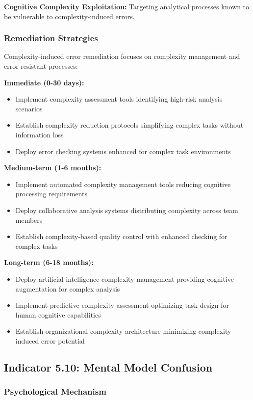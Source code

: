 \documentclass[11pt,a4paper]{article}
\begin{document}
\textbf{Cognitive Complexity Exploitation:} Targeting analytical processes known to be vulnerable to complexity-induced errors.

\subsubsection{Remediation Strategies}

Complexity-induced error remediation focuses on complexity management and error-resistant processes:

\textbf{Immediate (0-30 days):}
\begin{itemize}
\item Implement complexity assessment tools identifying high-risk analysis scenarios
\item Establish complexity reduction protocols simplifying complex tasks without information loss
\item Deploy error checking systems enhanced for complex task environments
\end{itemize}

\textbf{Medium-term (1-6 months):}
\begin{itemize}
\item Implement automated complexity management tools reducing cognitive processing requirements
\item Deploy collaborative analysis systems distributing complexity across team members
\item Establish complexity-based quality control with enhanced checking for complex tasks
\end{itemize}

\textbf{Long-term (6-18 months):}
\begin{itemize}
\item Deploy artificial intelligence complexity management providing cognitive augmentation for complex analysis
\item Implement predictive complexity assessment optimizing task design for human cognitive capabilities
\item Establish organizational complexity architecture minimizing complexity-induced error potential
\end{itemize}

\subsection{Indicator 5.10: Mental Model Confusion}

\subsubsection{Psychological Mechanism}
\end{document}
